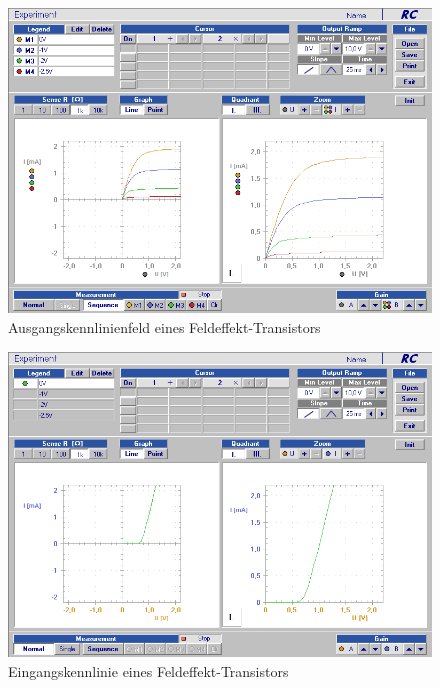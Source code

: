 \documentclass[12pt,a4paper]{article}
\begin{document}
\begin{figure}[H]
	\centering
	\includegraphics[scale=0.5]{./data/Braun_Kurz_PS8/FET_Ausgangskennlinien.png}
	\caption{Ausgangskennlinienfeld eines Feldeffekt-Transistors}
	\label{fig:ausgangskennlinienfeld_fet}
\end{figure}

\begin{figure}[H]
	\centering
	\includegraphics[scale=0.5]{./data/Braun_Kurz_PS8/FET_Eingangskennlinie.png}
	\caption{Eingangskennlinie eines Feldeffekt-Transistors}
	\label{fig:eingangskennlinien_fet}
\end{figure}
\end{document}

